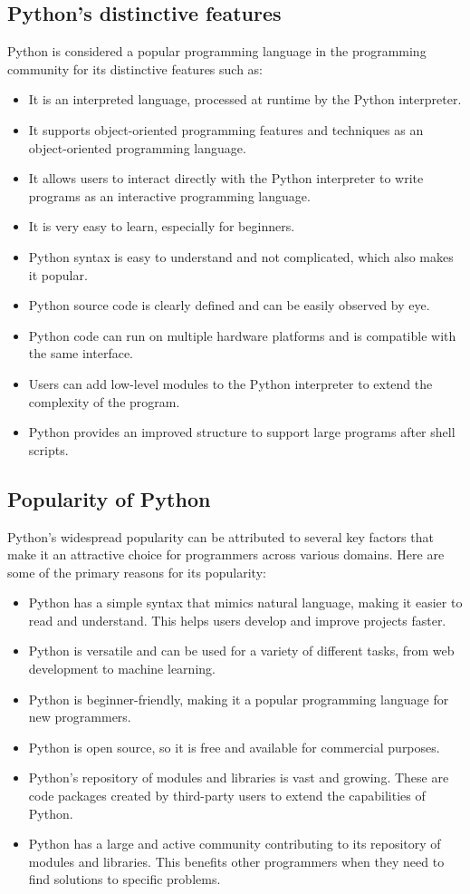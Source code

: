 \documentclass[12pt]{article}
\begin{document}
\subsection{Python’s distinctive features}
Python is considered a popular programming language in the programming community for its distinctive features such as:
\begin{itemize}
    \item It is an interpreted language, processed at runtime by the Python interpreter.
    \item It supports object-oriented programming features and techniques as an object-oriented programming language.
    \item It allows users to interact directly with the Python interpreter to write programs as an interactive programming language.
    \item It is very easy to learn, especially for beginners.
    \item Python syntax is easy to understand and not complicated, which also makes it popular.
    \item Python source code is clearly defined and can be easily observed by eye.
    \item Python code can run on multiple hardware platforms and is compatible with the same interface.
    \item Users can add low-level modules to the Python interpreter to extend the complexity of the program.
    \item Python provides an improved structure to support large programs after shell scripts.
\end{itemize}

\subsection{Popularity of Python}
Python's widespread popularity can be attributed to several key factors that make it an attractive choice for programmers across various domains. Here are some of the primary reasons for its popularity:

\begin{itemize}
    \item Python has a simple syntax that mimics natural language, making it easier to read and understand. This helps users develop and improve projects faster.
    \item Python is versatile and can be used for a variety of different tasks, from web development to machine learning.
    \item Python is beginner-friendly, making it a popular programming language for new programmers.
    \item Python is open source, so it is free and available for commercial purposes.
    \item Python’s repository of modules and libraries is vast and growing. These are code packages created by third-party users to extend the capabilities of Python.
    \item Python has a large and active community contributing to its repository of modules and libraries. This benefits other programmers when they need to find solutions to specific problems.
\end{itemize}
\end{document}
